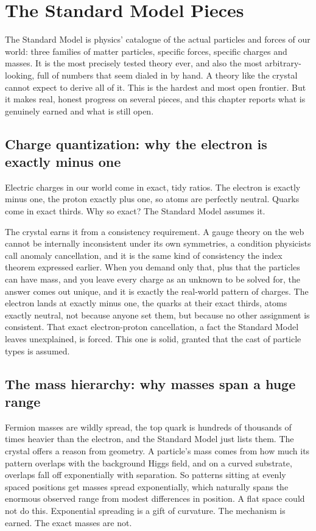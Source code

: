 \section{The Standard Model Pieces}

The Standard Model is physics' catalogue of the actual particles and forces of our world: three families of matter particles, specific forces, specific charges and masses. It is the most precisely tested theory ever, and also the most arbitrary-looking, full of numbers that seem dialed in by hand. A theory like the crystal cannot expect to derive all of it. This is the hardest and most open frontier. But it makes real, honest progress on several pieces, and this chapter reports what is genuinely earned and what is still open.

\subsection{Charge quantization: why the electron is exactly minus one}

Electric charges in our world come in exact, tidy ratios. The electron is exactly minus one, the proton exactly plus one, so atoms are perfectly neutral. Quarks come in exact thirds. Why so exact? The Standard Model assumes it.

The crystal earns it from a consistency requirement. A gauge theory on the web cannot be internally inconsistent under its own symmetries, a condition physicists call anomaly cancellation, and it is the same kind of consistency the index theorem expressed earlier. When you demand only that, plus that the particles can have mass, and you leave every charge as an unknown to be solved for, the answer comes out unique, and it is exactly the real-world pattern of charges. The electron lands at exactly minus one, the quarks at their exact thirds, atoms exactly neutral, not because anyone set them, but because no other assignment is consistent. That exact electron-proton cancellation, a fact the Standard Model leaves unexplained, is forced. This one is solid, granted that the cast of particle types is assumed.

\subsection{The mass hierarchy: why masses span a huge range}

Fermion masses are wildly spread, the top quark is hundreds of thousands of times heavier than the electron, and the Standard Model just lists them. The crystal offers a reason from geometry. A particle's mass comes from how much its pattern overlaps with the background Higgs field, and on a curved substrate, overlaps fall off exponentially with separation. So patterns sitting at evenly spaced positions get masses spread exponentially, which naturally spans the enormous observed range from modest differences in position. A flat space could not do this. Exponential spreading is a gift of curvature. The mechanism is earned. The exact masses are not.

